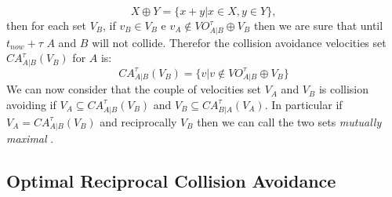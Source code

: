 \documentclass[11pt,twocolumn]{article}
\begin{document}
\begin{equation}
X \oplus Y = \{ x + y  |  x \in X , y \in Y\},
\end{equation}
then for each set $V_B$, if $v_B \in V_B$ e $v_A \notin VO_{A|B}^\tau \oplus V_B$ then we are sure that until $t_{now}+\tau$ $A$ and $B$ will not collide. Therefor the collision avoidance velocities set $CA^\tau_{A|B}(V_B)$ for $A$  is: 
\begin{equation}
CA_{A|B}^\tau(V_B) = \{ v |  v \notin VO_{A|B}^\tau \oplus V_B \}
\end{equation}
We can now consider that the couple of velocities set $V_A$ and $V_B$ is collision avoiding if $V_A \subseteq CA_{A|B}^\tau (V_B)$ and $V_B \subseteq CA^\tau_{B|A} (V_A)$. In particular if $V_A = CA^\tau_{A|B}(V_B)$ and reciprocally $V_B$ then we can call the two sets \textit{mutually maximal
}.

\subsection{Optimal Reciprocal Collision Avoidance}
\end{document}
